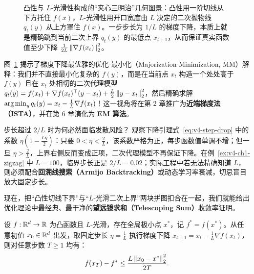 \begin{figure}[htbp]
\caption{凸性与 $L$-光滑性构成的“夹心三明治”几何图景：凸性用一阶切线从下方托住 $f(x)$，$L$-光滑性用开口宽度由 $L$ 决定的二次抛物线 $q_t(y)$ 从上方罩住 $f(x)$。一步步长为 $1/L$ 的梯度下降，本质上就是精确跳到当前二次上界 $q_t(y)$ 的最低点 $x_{t+1}$，从而保证真实函数值至少下降 $\frac{1}{2L}\left\|\nabla f(x_t)\right\|_2^2$。}\label{fig:v4-sandwich}
\end{figure}

图~\ref{fig:v4-sandwich} 揭示了梯度下降最优雅的优化-最小化（Majorization-Minimization, MM）解释：我们并不直接最小化复杂的 $f(y)$，而是在当前点 $x_t$ 构造一个处处高于 $f(y)$ 且在 $x_t$ 处相切的二次代理模型 $q_t(y) = f(x_t) + \nabla f(x_t)^\top(y-x_t) + \frac{L}{2}\left\|y-x_t\right\|_2^2$，然后精确求解 $\operatorname*{arg\,min}_y q_t(y) = x_t - \frac{1}{L}\nabla f(x_t)$！这一视角将在第 2 章推广为\textbf{近端梯度法（ISTA）}，并在第 6 章演化为 \textbf{EM 算法}。

\begin{failBox}{步长超过 $2/L$ 时为何必然面临发散风险？}
观察下降引理式~\eqref{eq:v4-step-drop} 中的系数 $\eta(1 - \frac{L\eta}{2})$：只要 $0 < \eta < \frac{2}{L}$，该系数严格为正，每步函数值单调不增；但一旦 $\eta > \frac{2}{L}$，上界右侧反而变成正项，二次代理模型不再保证下降。在例~\ref{ex:v4-ch1-zigzag} 中 $L=100$，临界步长正是 $2/L = 0.02$；实际工程中若无法精确知道 $L$，则必须配合\textbf{回溯线搜索（Armijo Backtracking）}或动态学习率衰减，切忌盲目放大固定步长。
\end{failBox}

现在，把“凸性切线下界”与“$L$-光滑二次上界”两块拼图扣合在一起，我们就能给出优化理论中最经典、最干净的\textbf{望远镜求和（Telescoping Sum）}收敛率证明。

\begin{thmBox}
\begin{theorem}\label{thm:v4-gd-convex}
设 $f: \mathbb{R}^d \to \mathbb{R}$ 为凸函数且 $L$-光滑，存在全局极小点 $x^*$，记 $f^* = f(x^*)$。从任意初值 $x_0 \in \mathbb{R}^d$ 出发，取固定步长 $\eta = \frac{1}{L}$ 执行梯度下降 $x_{t+1} = x_t - \frac{1}{L}\nabla f(x_t)$，则对任意步数 $T \ge 1$ 均有：
\begin{equation}\label{eq:v4-gd-o1t}
  f(x_T) - f^* \le \frac{L\left\|x_0 - x^*\right\|_2^2}{2T}.
\end{equation}
\end{theorem}
\end{thmBox}

